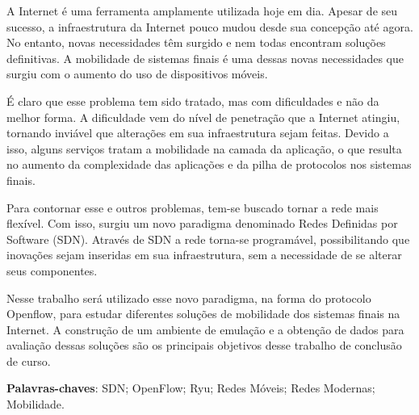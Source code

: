 \documentclass[	12pt, Times, openright, twoside, a4paper, english, brazil]{abntex2}
\begin{document}
\begin{resumo}

\par A Internet é uma ferramenta amplamente utilizada hoje em dia. Apesar de seu sucesso, a infraestrutura da Internet pouco mudou desde sua concepção até agora. No entanto, novas necessidades têm surgido e nem todas encontram soluções definitivas. A mobilidade de sistemas finais é uma dessas novas necessidades que surgiu com o aumento do uso de dispositivos móveis. 
\par É claro que esse problema tem sido tratado, mas com dificuldades e não da melhor forma. A dificuldade vem do nível de penetração que a Internet atingiu, tornando inviável que alterações em sua infraestrutura sejam feitas. Devido a isso, alguns serviços tratam a mobilidade na camada da aplicação, o que resulta no aumento da complexidade das aplicações e da pilha de protocolos nos sistemas finais.
\par Para contornar esse e outros problemas, tem-se buscado tornar a rede mais flexível. Com isso, surgiu um novo paradigma denominado Redes Definidas por Software (SDN). Através de SDN a rede torna-se programável, possibilitando que inovações sejam inseridas em sua infraestrutura, sem a necessidade de se alterar seus componentes.
\par Nesse trabalho será utilizado esse novo paradigma, na forma do protocolo Openflow, para estudar diferentes soluções de mobilidade dos sistemas finais na Internet. A construção de um ambiente de emulação e a obtenção de dados para avaliação dessas soluções são os principais objetivos desse trabalho de conclusão de curso.


 \vspace{\onelineskip}
    
 \noindent
 \textbf{Palavras-chaves}: SDN; OpenFlow; Ryu; Redes Móveis; Redes Modernas; Mobilidade.
\end{resumo}
\end{document}
